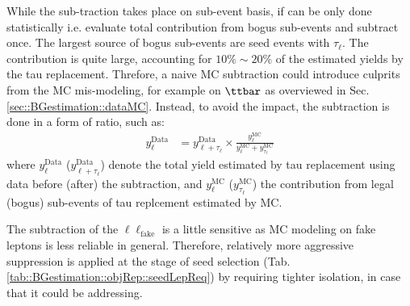 While the sub-traction takes place on sub-event basis, if can be only done statistically i.e. evaluate total contribution from bogus sub-events and subtract once. The largest source of bogus sub-events are seed events with $\tau_{\ell}$.
The contribution is quite large, accounting for $10\%\sim20\%$ of the estimated yields by the tau replacement. 
Threfore, a naive MC subtraction could introduce culprits from the MC mis-modeling, for example on $\ttbar$ as overviewed in Sec. \ref{sec::BGestimation::dataMC}. Instead, to avoid the impact, the subtraction is done in a form of ratio, such as:
\begin{align}
  y^{\mathrm{Data}}_{\ell} 
  & = y^{\mathrm{Data}}_{\ell+\tau_{\ell}} \times \frac{y^{\mathrm{MC}}_{\ell}}{y^{\mathrm{MC}}_{\ell}+y^{\mathrm{MC}}_{\tau_{\ell}}}  
\end{align}
where $y^{\mathrm{Data}}_{\ell}$ ($y^{\mathrm{Data}}_{\ell+\tau_{\ell}}$) denote the total yield estimated by tau replacement using data before (after) the subtraction, and $y^{\mathrm{MC}}_{\ell}$ ($y^{\mathrm{MC}}_{\tau_{\mathrm{\ell}}}$) the contribution from legal (bogus) sub-events of tau replcement estimated by MC.

The subtraction of the $\ell\ell_{\mathrm{fake}}$ is a little sensitive as MC modeling on fake leptons is less reliable in general. Therefore, relatively more aggressive suppression is applied at the stage of seed selection (Tab. \ref{tab::BGestimation::objRep::seedLepReq}) by requiring tighter isolation, in case that it could be addressing. \\


